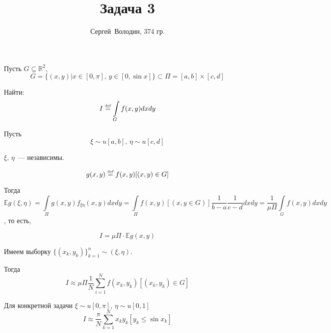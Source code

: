 \documentclass[a4paper]{article}
\author{Сергей~Володин, 374 гр.}
\title{Задача 3}
\def\eqdef{\overset{\mbox{\tiny def}}{=}}
\begin{document}
\maketitle
Пусть $G\subseteq \mathbb{R}^2$, $$G=\{(x,y)|x\in[0,\pi],\,y\in[0,\sin x]\}\subset \Pi=[a,b]\times[c,d]$$

Найти: $$I\eqdef \int\limits_G f(x,y)dxdy$$

Пусть $$\xi\sim u[a,b],\,\eta\sim u[c,d]$$

$\xi,\,\eta$~--- независимы.

$$g(x,y)\eqdef f(x,y)[(x,y)\in G]$$

Тогда $$\mathbb{E} g(\xi,\eta)=\int\limits_\Pi g(x,y)f_{\xi\eta}(x,y)dxdy=\int\limits_\Pi f(x,y)[(x,y\in G)]\frac{1}{b-a}\frac{1}{c-d}dxdy=\frac{1}{\mu \Pi}\int\limits_G f(x,y) dxdy$$, то есть,

$$I=\mu \Pi\cdot \mathbb{E}g(x,y)$$

Имеем выборку $\{(x_k,y_k)\}_{k=1}^n\sim (\xi,\eta)$.

Тогда $$I\approx \mu\Pi\frac{1}{N}\sum\limits_{i=1}^Nf(x_k,y_k)[(x_k,y_k)\in G]$$

Для конкретной задачи $\xi\sim u[0,\pi]$, $\eta\sim u[0,1]$ $$I\approx\frac{\pi}{N}\sum\limits_{k=1}^Nx_ky_k[y_k\leqslant\sin x_k]$$
\end{document}

